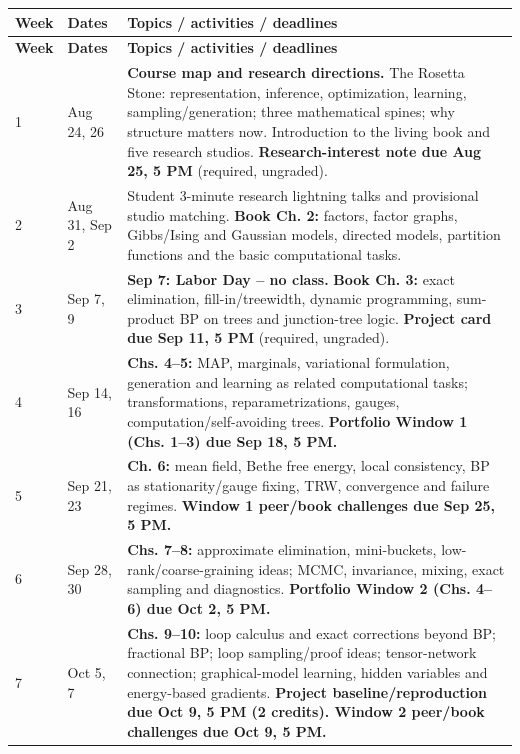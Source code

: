 \documentclass[11pt]{article}
\begin{document}
\small
\begin{longtable}{p{1.45cm} p{2.75cm} p{8.9cm}}
\toprule
\textbf{Week} & \textbf{Dates} & \textbf{Topics / activities / deadlines}\\
\midrule
\endfirsthead
\toprule
\textbf{Week} & \textbf{Dates} & \textbf{Topics / activities / deadlines}\\
\midrule
\endhead

1 & Aug 24, 26 & \textbf{Course map and research directions.} The Rosetta Stone: representation, inference, optimization, learning, sampling/generation; three mathematical spines; why structure matters now. Introduction to the living book and five research studios. \textbf{Research-interest note due Aug 25, 5 PM} (required, ungraded).\\

2 & Aug 31, Sep 2 & Student 3-minute research lightning talks and provisional studio matching. \textbf{Book Ch. 2:} factors, factor graphs, Gibbs/Ising and Gaussian models, directed models, partition functions and the basic computational tasks.\\

3 & Sep 7, 9 & \textbf{Sep 7: Labor Day -- no class.} \textbf{Book Ch. 3:} exact elimination, fill-in/treewidth, dynamic programming, sum-product BP on trees and junction-tree logic. \textbf{Project card due Sep 11, 5 PM} (required, ungraded).\\

4 & Sep 14, 16 & \textbf{Chs. 4--5:} MAP, marginals, variational formulation, generation and learning as related computational tasks; transformations, reparametrizations, gauges, computation/self-avoiding trees. \textbf{Portfolio Window 1 (Chs. 1--3) due Sep 18, 5 PM.}\\

5 & Sep 21, 23 & \textbf{Ch. 6:} mean field, Bethe free energy, local consistency, BP as stationarity/gauge fixing, TRW, convergence and failure regimes. \textbf{Window 1 peer/book challenges due Sep 25, 5 PM.}\\

6 & Sep 28, 30 & \textbf{Chs. 7--8:} approximate elimination, mini-buckets, low-rank/coarse-graining ideas; MCMC, invariance, mixing, exact sampling and diagnostics. \textbf{Portfolio Window 2 (Chs. 4--6) due Oct 2, 5 PM.}\\

7 & Oct 5, 7 & \textbf{Chs. 9--10:} loop calculus and exact corrections beyond BP; fractional BP; loop sampling/proof ideas; tensor-network connection; graphical-model learning, hidden variables and energy-based gradients. \textbf{Project baseline/reproduction due Oct 9, 5 PM (2 credits). Window 2 peer/book challenges due Oct 9, 5 PM.}\\


\end{longtable}
\end{document}
